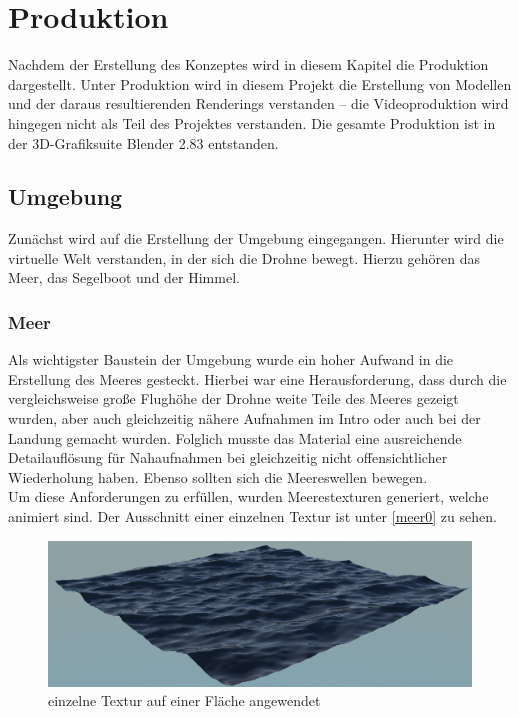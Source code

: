 \chapter{Produktion}
Nachdem der Erstellung des Konzeptes wird in diesem Kapitel die Produktion dargestellt. Unter Produktion wird in diesem Projekt die Erstellung von Modellen und der daraus resultierenden Renderings verstanden -- die Videoproduktion wird hingegen nicht als Teil des Projektes verstanden. Die gesamte Produktion ist in der 3D-Grafiksuite Blender 2.83 entstanden.

\section{Umgebung}

Zunächst wird auf die Erstellung der Umgebung eingegangen. Hierunter wird die virtuelle Welt verstanden, in der sich die Drohne bewegt. Hierzu gehören das Meer, das Segelboot und der Himmel.

\subsection{Meer}

Als wichtigster Baustein der Umgebung wurde ein hoher Aufwand in die Erstellung des Meeres gesteckt. Hierbei war eine Herausforderung, dass durch die vergleichsweise große Flughöhe der Drohne weite Teile des Meeres gezeigt wurden, aber auch gleichzeitig nähere Aufnahmen im Intro oder auch bei der Landung gemacht wurden. Folglich musste das Material eine ausreichende Detailauflösung für Nahaufnahmen bei gleichzeitig nicht offensichtlicher Wiederholung haben. Ebenso sollten sich die Meereswellen bewegen.\\
Um diese Anforderungen zu erfüllen, wurden Meerestexturen generiert, welche animiert sind. Der Ausschnitt einer einzelnen Textur ist unter \autoref{meer0} zu sehen. 

\begin{figure}[H]
\includegraphics[width=\textwidth]{gfx/prod/ocean/meer0.jpg}
\caption{einzelne Textur auf einer Fläche angewendet}
\label{meer0}
\end{figure}

